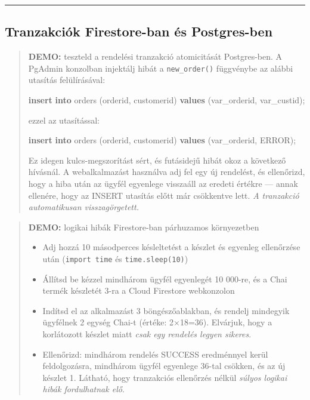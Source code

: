 \documentclass[
  magyar,
]{article}
\newenvironment{Shaded}{}{}
\newcommand{\KeywordTok}[1]{\textcolor[rgb]{0.00,0.44,0.13}{\textbf{#1}}}
\newcommand{\NormalTok}[1]{#1}
\newcommand{\StringTok}[1]{\textcolor[rgb]{0.25,0.44,0.63}{#1}}
\providecommand{\tightlist}{%
  \setlength{\itemsep}{0pt}\setlength{\parskip}{0pt}}
\begin{document}
\begin{center}\rule{0.5\linewidth}{0.5pt}\end{center}

\subsection{Tranzakciók Firestore-ban és
Postgres-ben}\label{tranzakciuxf3k-firestore-ban-uxe9s-postgres-ben}

\begin{quote}
\textbf{DEMO:} teszteld a rendelési tranzakció atomicitását
Postgres-ben. A PgAdmin konzolban injektálj hibát a
\texttt{new\_order()} függvénybe az alábbi utasítás felülírásával:

\begin{Shaded}
\begin{Highlighting}[]
\KeywordTok{insert} \KeywordTok{into}\NormalTok{ orders (orderid, customerid) }\KeywordTok{values}\NormalTok{ (var\_orderid, var\_custid);}
\end{Highlighting}
\end{Shaded}

ezzel az utasítással:

\begin{Shaded}
\begin{Highlighting}[]
\KeywordTok{insert} \KeywordTok{into}\NormalTok{ orders (orderid, customerid) }\KeywordTok{values}\NormalTok{ (var\_orderid, }\StringTok{\textquotesingle{}ERROR\textquotesingle{}}\NormalTok{);}
\end{Highlighting}
\end{Shaded}

Ez idegen kulcs-megszorítást sért, és futásidejű hibát okoz a következő
hívásnál. A webalkalmazást használva adj fel egy új rendelést, és
ellenőrizd, hogy a hiba után az ügyfél egyenlege visszaáll az eredeti
értékre --- annak ellenére, hogy az INSERT utasítás előtt már csökkentve
lett. \emph{A tranzakció automatikusan visszagörgetett.}
\end{quote}

\begin{quote}
\textbf{DEMO:} logikai hibák Firestore-ban párhuzamos környezetben

\begin{itemize}
\tightlist
\item
  Adj hozzá 10 másodperces késleltetést a készlet és egyenleg
  ellenőrzése után (\texttt{import\ time} és \texttt{time.sleep(10)})
\item
  Állítsd be kézzel mindhárom ügyfél egyenlegét 10 000-re, és a Chai
  termék készletét 3-ra a Cloud Firestore webkonzolon
\item
  Indítsd el az alkalmazást 3 böngészőablakban, és rendelj mindegyik
  ügyfélnek 2 egység Chai-t (értéke: 2×18=36). Elvárjuk, hogy a
  korlátozott készlet miatt \emph{csak egy rendelés legyen sikeres}.
\item
  Ellenőrizd: mindhárom rendelés SUCCESS eredménnyel kerül
  feldolgozásra, mindhárom ügyfél egyenlege 36-tal csökken, és az új
  készlet 1. Látható, hogy tranzakciós ellenőrzés nélkül \emph{súlyos
  logikai hibák fordulhatnak elő}.
\end{itemize}
\end{quote}
\end{document}
